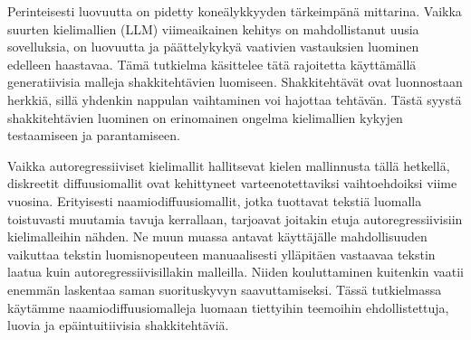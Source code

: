 \documentclass[english, 12pt, a4paper, sci, utf8, a-2b, online]{aaltothesis}
\theoremstyle{definition}
\theoremstyle{plain}
\theoremstyle{remark}
\begin{document}
\newpage
\begin{abstractpage}[finnish]
    Perinteisesti luovuutta on pidetty koneälykkyyden tärkeimpänä mittarina. Vaikka suurten kielimallien (LLM) viimeaikainen kehitys on mahdollistanut uusia sovelluksia, on luovuutta ja päättelykykyä vaativien vastauksien luominen edelleen haastavaa. Tämä tutkielma käsittelee tätä rajoitetta käyttämällä generatiivisia malleja shakkitehtävien luomiseen. Shakkitehtävät ovat luonnostaan herkkiä, sillä yhdenkin nappulan vaihtaminen voi hajottaa tehtävän. Tästä syystä shakkitehtävien luominen on erinomainen ongelma kielimallien kykyjen testaamiseen ja parantamiseen.


    Vaikka autoregressiiviset kielimallit hallitsevat kielen mallinnusta tällä hetkellä, diskreetit diffuusiomallit ovat kehittyneet varteenotettaviksi vaihtoehdoiksi viime vuosina. Erityisesti naamiodiffuusiomallit, jotka tuottavat tekstiä luomalla toistuvasti muutamia tavuja kerrallaan, tarjoavat joitakin etuja autoregressiivisiin kielimalleihin nähden. Ne muun muassa antavat käyttäjälle mahdollisuuden vaikuttaa tekstin luomisnopeuteen manuaalisesti ylläpitäen vastaavaa tekstin laatua kuin autoregressiivisillakin malleilla. Niiden kouluttaminen kuitenkin vaatii enemmän laskentaa saman suorituskyvyn saavuttamiseksi. Tässä tutkielmassa käytämme naamiodiffuusiomalleja luomaan tiettyihin teemoihin ehdollistettuja, luovia ja epäintuitiivisia shakkitehtäviä.


\end{abstractpage}
\end{document}
